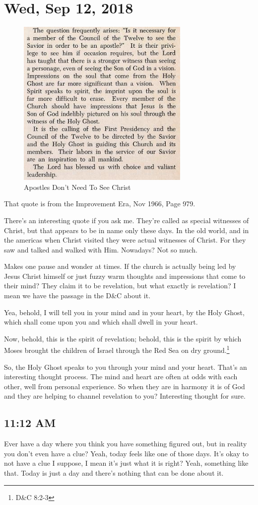\section{Wed, Sep 12, 2018}

\begin{figure}[h!]
  \centering
  \includegraphics[width=.5\linewidth]{2018/images/apostle.png}
  \caption{Apostles Don't Need To See Christ}
  \label{fig:apostle}
\end{figure}

That quote is from the Improvement Era, Nov 1966, Page 979.

There's an interesting quote if you ask me. They're called as special witnesses of
Christ, but that appears to be in name only these days. In the old world, and in the
americas when Christ visited they were actual witnesses of Christ. For they saw and
talked and walked with Him. Nowadays? Not so much.

Makes one pause and wonder at times. If the church is actually being led by Jesus
Christ himself or just fuzzy warm thoughts and impressions that come to their mind?
They claim it to be revelation, but what exactly is revelation? I mean we have the
passage in the D\&C about it.

\begin{displayquote}
Yea, behold, I will tell you in your mind and in your heart, by the Holy Ghost, 
which shall come upon you and which shall dwell in your heart.

Now, behold, this is the spirit of revelation; behold, this is the spirit by which 
Moses brought the children of Israel through the Red Sea on dry ground.\footnote{
D\&C 8:2-3
}
\end{displayquote}

So, the Holy Ghost speaks to you through your mind and your heart. That's an
interesting thought process. The mind and heart are often at odds with each other,
well from personal experience. So when they are in harmony it is of God and they are
helping to channel revelation to you? Interesting thought for sure.

\subsection{11:12 AM}

Ever have a day where you think you have something figured out, but in reality you
don't even have a clue? Yeah, today feels like one of those days. It's okay to not
have a clue I suppose, I mean it's just what it is right? Yeah, something like that.
Today is just a day and there's nothing that can be done about it.